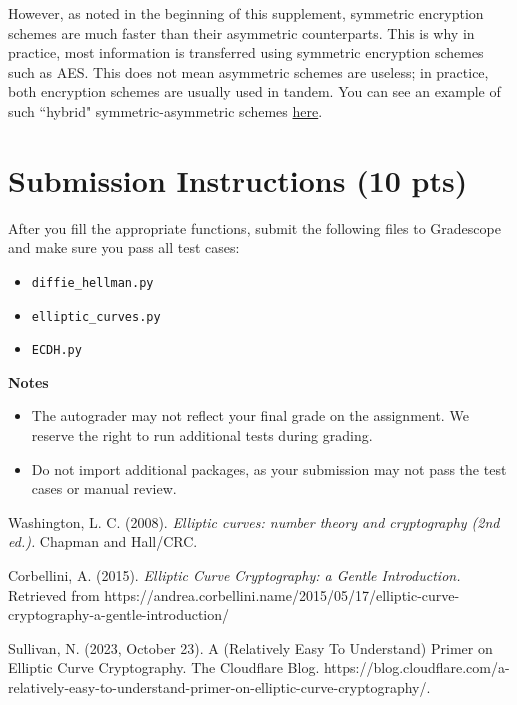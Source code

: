 \documentclass{article}
\begin{document}
    \vspace{3mm}
    However, as noted in the beginning of this supplement, symmetric encryption schemes are much faster than their asymmetric counterparts. This is why in practice, most information is transferred using symmetric encryption schemes such as AES. This does not mean asymmetric schemes are useless; in practice, both encryption schemes are usually used in tandem. You can see an example of such ``hybrid" symmetric-asymmetric schemes \href{https://github.com/nakov/Practical-Cryptography-for-Developers-Book/blob/master/asymmetric-key-ciphers/ecc-encryption-decryption.md}{here}.

\section*{Submission Instructions (10 pts)}
    After you fill the appropriate functions, submit the following files to Gradescope and make sure you pass all test cases:
    \begin{itemize}
        \item \lstinline{diffie_hellman.py}
        \item \lstinline{elliptic_curves.py}
        \item \lstinline{ECDH.py}
    \end{itemize}

    \vspace{3mm}
    \textbf{Notes}
    \begin{itemize}
        \item The autograder may not reflect your final grade on the assignment. We reserve the right to run additional tests during grading.
        \item Do not import additional packages, as your submission may not pass the test cases or manual review.
    \end{itemize}

\begin{thebibliography}{9}
    Washington, L. C. (2008). \textit{Elliptic curves: number theory and cryptography (2nd ed.).} Chapman and Hall/CRC.

    Corbellini, A. (2015). \textit{Elliptic Curve Cryptography: a Gentle Introduction.} Retrieved from https://andrea.corbellini.name/2015/05/17/elliptic-curve-cryptography-a-gentle-introduction/
    
    Sullivan, N. (2023, October 23). A (Relatively Easy To Understand) Primer on Elliptic Curve Cryptography. The Cloudflare Blog. https://blog.cloudflare.com/a-relatively-easy-to-understand-primer-on-elliptic-curve-cryptography/.
\end{thebibliography}
\end{document}

